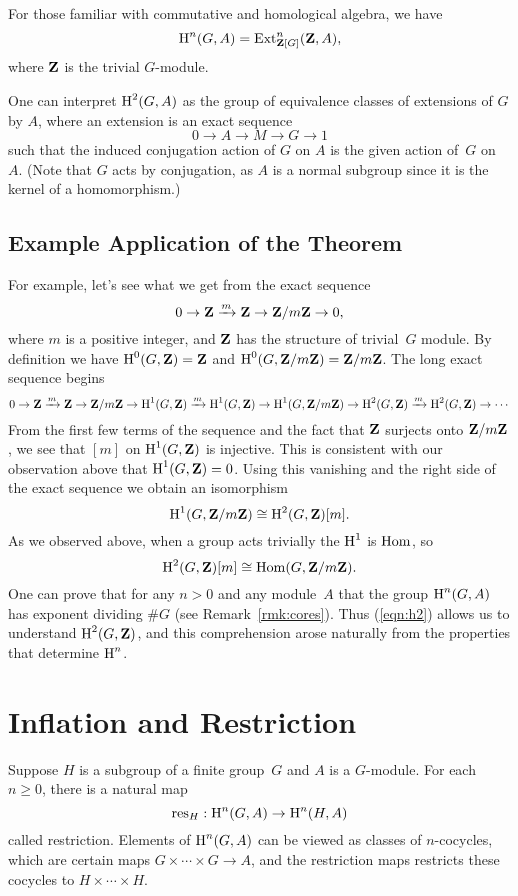 \begin{remark}
  For those familiar with commutative and homological algebra, we have
$$
  \operatorname{H}^n(G,A) = \operatorname{Ext}^n_{\mathbf{Z}[G]}(\mathbf{Z}, A),
$$
where $\mathbf{Z}$ is the trivial $G$-module.
\end{remark}

\begin{remark}
  One can interpret $\operatorname{H}^2(G,A)$ as the group of equivalence classes of
  extensions of $G$ by $A$, where an extension is an exact sequence
  $$0\to A \to M \to G \to 1$$ such that the induced conjugation action
  of $G$ on $A$ is the given action of~$G$ on~$A$.
(Note that $G$ acts by conjugation, as $A$ is a normal
subgroup since it is the kernel of a homomorphism.)
\end{remark}


\subsection{Example Application of the Theorem}
For example, let's see what we get from the exact sequence
$$
 0 \to \mathbf{Z} \xrightarrow{m} \mathbf{Z} \to \mathbf{Z}/m\mathbf{Z} \to 0,
$$
where $m$ is a positive integer, and $\mathbf{Z}$ has the structure of 
trivial~$G$ module.  By definition we have
$\operatorname{H}^0(G,\mathbf{Z}) = \mathbf{Z}$ and $\operatorname{H}^0(G,\mathbf{Z}/m\mathbf{Z})=\mathbf{Z}/m\mathbf{Z}$.
The long exact sequence begins
$$
  0 \to \mathbf{Z} \xrightarrow{m} \mathbf{Z} \to \mathbf{Z}/m\mathbf{Z} \to \operatorname{H}^1(G,\mathbf{Z}) \xrightarrow{m} 
\operatorname{H}^1(G,\mathbf{Z}) \to \operatorname{H}^1(G,\mathbf{Z}/m\mathbf{Z})\to
\operatorname{H}^2(G,\mathbf{Z}) \xrightarrow{m} \operatorname{H}^2(G,\mathbf{Z}) \to \cdots
$$
From the first few terms of the sequence and the fact
that $\mathbf{Z}$ surjects onto $\mathbf{Z}/m\mathbf{Z}$, we see that $[m]$ 
on $\operatorname{H}^1(G,\mathbf{Z})$ is injective.
This is consistent with our observation above that
$\operatorname{H}^1(G,\mathbf{Z}) = 0$. Using this vanishing and the right side of the 
exact sequence we obtain an isomorphism
$$
\operatorname{H}^1(G,\mathbf{Z}/m\mathbf{Z}) \cong \operatorname{H}^2(G,\mathbf{Z})[m].
$$
As we observed above, when a group acts trivially the $\operatorname{H}^1$
is $\operatorname{Hom}$, so
\begin{equation}\label{eqn:h2}
  \operatorname{H}^2(G,\mathbf{Z})[m] \cong \operatorname{Hom}(G,\mathbf{Z}/m\mathbf{Z}).
\end{equation}
One can prove that for any $n>0$ and any module~$A$ that the group
$\operatorname{H}^n(G,A)$ has exponent dividing $\#G$ (see Remark~\ref{rmk:cores}).  
Thus (\ref{eqn:h2}) allows
us to understand $\operatorname{H}^2(G,\mathbf{Z})$, and this comprehension arose
naturally from the properties that determine $\operatorname{H}^n$.



\section{Inflation and Restriction}
Suppose $H$ is a subgroup of a finite group~$G$ and $A$
is a $G$-module.  For each~$n\geq 0$, there is a natural map
$$
  \operatorname{res}_H : \operatorname{H}^n(G,A) \to \operatorname{H}^n(H,A)
$$
called restriction.  Elements of $\operatorname{H}^n(G,A)$ can be viewed as classes
of $n$-cocycles, which are certain maps $G \times \cdots \times G \to
A$, and the restriction maps  restricts these cocycles to $H
\times \cdots \times H$.  

